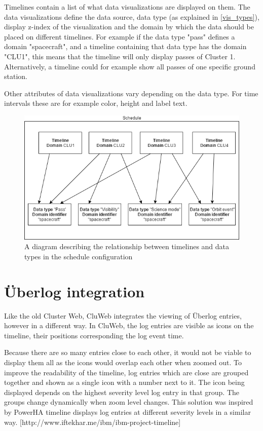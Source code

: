Timelines contain a list of what data visualizations are displayed on them. The data visualizations define the data source, data type (as explained in \ref{vis_types}), display z-index of the visualization and the domain by which the data should be placed on different timelines. For example if the data type "pass" defines a domain "spacecraft", and a timeline containing that data type has the domain "CLU1", this means that the timeline will only display passes of Cluster 1. Alternatively, a timeline could for example show all passes of one specific ground station.

Other attributes of data visualizations vary depending on the data type. For time intervals these are for example color, height and label text.

\begin{figure}[ht]
  \begin{center}
    \includegraphics*[width=1\textwidth]{schedule_diagram}
  \end{center}
  \caption{A diagram describing the relationship between timelines and data types in the schedule configuration}
  \label{fig:schedule_diagram}
\end{figure}


\section{Überlog integration}
Like the old Cluster Web, CluWeb integrates the viewing of Überlog entries, however in a different way. In CluWeb, the log entries are visible as icons on the timeline, their positions corresponding the log event time. 

Because there are so many entries close to each other, it would not be viable to display them all as the icons would overlap each other when zoomed out. To improve the readability of the timeline, log entries which are close are grouped together and shown as a single icon with a number next to it. The icon being displayed depends on the highest severity level log entry in that group. The groups change dynamically when zoom level changes. This solution was inspired by PowerHA timeline displays log entries at different severity levels in a similar way. [http://www.iftekhar.me/ibm/ibm-project-timeline]

